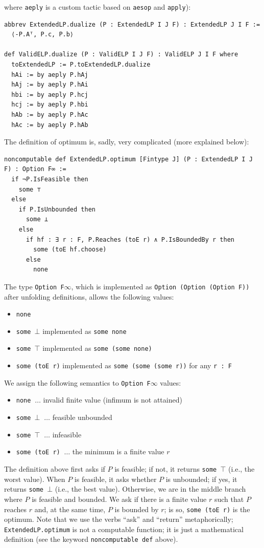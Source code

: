 \documentclass[]{article}
\renewcommand{\.}{\hskip .75pt}
\begin{document}
where \texttt{aeply} is a custom tactic based on \texttt{aesop} \cite{Aesop}
and \texttt{apply}):
\begin{lstlisting}
abbrev ExtendedLP.dualize (P : ExtendedLP I J F) : ExtendedLP J I F :=
  ⟨-P.Aᵀ, P.c, P.b⟩

def ValidELP.dualize (P : ValidELP I J F) : ValidELP J I F where
  toExtendedLP := P.toExtendedLP.dualize
  hAi := by aeply P.hAj
  hAj := by aeply P.hAi
  hbi := by aeply P.hcj
  hcj := by aeply P.hbi
  hAb := by aeply P.hAc
  hAc := by aeply P.hAb
\end{lstlisting}
The definition of optimum is, sadly, very complicated (more explained below):
\begin{lstlisting}
noncomputable def ExtendedLP.optimum [Fintype J] (P : ExtendedLP I J F) : Option F∞ :=
  if ¬P.IsFeasible then
    some ⊤
  else
    if P.IsUnbounded then
      some ⊥
    else
      if hf : ∃ r : F, P.Reaches (toE r) ∧ P.IsBoundedBy r then
        some (toE hf.choose)
      else
        none
\end{lstlisting}
The type \texttt{Option F$\infty$}, which is implemented as
\texttt{Option (Option (Option F))} after unfolding definitions,
allows the following values:
\begin{itemize}
\item \texttt{none}
\item \texttt{some $\bot$} implemented as \texttt{some none}
\item \texttt{some $\top$} implemented as \texttt{some (some none)}
\item \texttt{some (toE r)} implemented as \texttt{some (some (some r))} for any \texttt{r :~F}
\end{itemize}
We assign the following semantics to \texttt{Option F$\infty$} values:
\begin{itemize}
\item \texttt{none} $\ \dots$ invalid finite value (infimum is not attained)
\item \texttt{some $\bot$} $\ \dots$ feasible unbounded
\item \texttt{some $\top$} $\ \dots$ infeasible
\item \texttt{some (toE r)} $\ \dots$ the minimum is a finite value $r$
\end{itemize}
The definition above first asks if $P$ is feasible; if not, it returns \texttt{some $\top$}
(i.e., the worst value).
When $P$ is feasible, it asks whether $P$ is unbounded; if yes, it returns \texttt{some $\bot$}
(i.e., the best value).
Otherwise, we are in the middle branch where $P$ is feasible and bounded.
We ask if there is a finite value $r$ such that $P$ reaches $r$ and, at the same time,
$P$ is bounded by $r$; is so, \texttt{some (toE r)} is the optimum.
Note that we use the verbs ``ask'' and ``return'' metaphorically;
\texttt{ExtendedLP.optimum} is not a computable function; it is just a mathematical
definition (see the keyword \texttt{noncomputable def} above).
\end{document}
